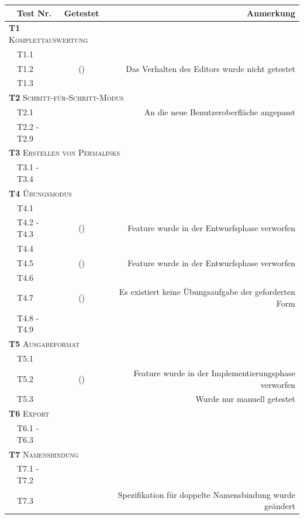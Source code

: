 \documentclass[parskip=full,11pt,openany]{scrreprt}
\newcommand{\cmark}{\ding{51}}%
\newcommand{\xmark}{\ding{55}}%
\begin{document}
\begin{table}[h]
	\centering
	\begin{tabular}{@{}ll|c|r@{}}
		\toprule
		&\textbf{Test Nr.} & \textbf{Getestet} &\textbf{Anmerkung} \\ 
		\midrule
		\multicolumn{3}{l|}{\small \textsc{\textbf{T1} Komplettauswertung}} \\ 
		&T1.1 & \cmark & \\
		&T1.2 & (\cmark) & Das Verhalten des Editors wurde nicht getestet \\
		&T1.3 & \cmark & \\ 
		\multicolumn{4}{l}{\small \textsc{\textbf{T2} Schritt-für-Schritt-Modus}}\\ 
		&T2.1 & \cmark & An die neue Benutzeroberfläche angepasst \\
		&T2.2 - T2.9 & \cmark & \\
		\multicolumn{4}{l}{\small \textsc{\textbf{T3} Erstellen von Permalinks}}\\ 	
		&T3.1 - T3.4 & \cmark & \\
		\multicolumn{3}{l|}{\small \textsc{\textbf{T4} Übungsmodus}}\\ 
		&T4.1 & \cmark & \\
		&T4.2 - T4.3 & (\xmark) & Feature wurde in der Entwurfsphase verworfen \\
		&T4.4 & \cmark & \\
		&T4.5 & (\xmark) & Feature wurde in der Entwurfsphase verworfen \\
		&T4.6 & \cmark & \\
		&T4.7 & (\xmark) & Es existiert keine Übungsaufgabe der geforderten Form \\
		&T4.8 - T4.9 & \cmark & \\
		\multicolumn{3}{l|}{\small \textsc{\textbf{T5} Ausgabeformat}}\\ 
		&T5.1 & \cmark & \\
		&T5.2 & (\xmark) & Feature wurde in der Implementierungsphase verworfen\\
		&T5.3 & \xmark & Wurde nur manuell getestet \\ %
		\multicolumn{2}{l|}{\small \textsc{\textbf{T6} Export}} & &\\ 
		&T6.1 - T6.3 & \cmark & \\
		\multicolumn{3}{l|}{\small \textsc{\textbf{T7} Namensbindung}}\\ 
		&T7.1 - T7.2 & \cmark & \\
		&T7.3 & \cmark & Spezifikation für doppelte Namensbindung wurde geändert \\ %

\end{tabular}
\end{table}
\end{document}
